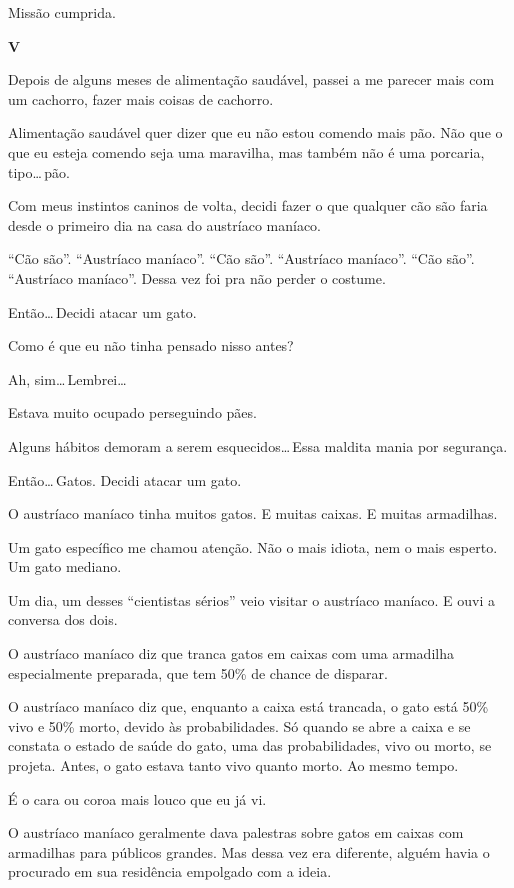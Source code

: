 Missão cumprida.

\begin{center}
{\Large \textbf{V}}
\end{center}

Depois de alguns meses de alimentação saudável, passei a me parecer mais com um cachorro, fazer mais coisas de cachorro.

Alimentação saudável quer dizer que eu não estou comendo mais pão. Não que o que eu esteja comendo seja uma maravilha, mas também não é uma porcaria, tipo\ldots\,pão.

Com meus instintos caninos de volta, decidi fazer o que qualquer cão são faria desde o primeiro dia na casa do austríaco maníaco.

``Cão são''. ``Austríaco maníaco''. ``Cão são''. ``Austríaco maníaco''. ``Cão são''. ``Austríaco maníaco''. Dessa vez foi pra não perder o costume.

Então\ldots\,Decidi atacar um gato.

Como é que eu não tinha pensado nisso antes?

Ah, sim\ldots\,Lembrei\ldots

Estava muito ocupado perseguindo pães.

Alguns hábitos demoram a serem esquecidos\ldots\,Essa maldita mania por segurança.

Então\ldots\,Gatos. Decidi atacar um gato.

O austríaco maníaco tinha muitos gatos. E muitas caixas. E muitas armadilhas.

Um gato específico me chamou atenção. Não o mais idiota, nem o mais esperto. Um gato mediano.

Um dia, um desses ``cientistas sérios'' veio visitar o austríaco maníaco. E ouvi a conversa dos dois.

O austríaco maníaco diz que tranca gatos em caixas com uma armadilha especialmente preparada, que tem 50\% de chance de disparar.

O austríaco maníaco diz que, enquanto a caixa está trancada, o gato está 50\% vivo e 50\% morto, devido às probabilidades. Só quando se abre a caixa e se constata o estado de saúde do gato, uma das probabilidades, vivo ou morto, se projeta. Antes, o gato estava tanto vivo quanto morto. Ao mesmo tempo.

É o cara ou coroa mais louco que eu já vi.

O austríaco maníaco geralmente dava palestras sobre gatos em caixas com armadilhas para públicos grandes. Mas dessa vez era diferente, alguém havia o procurado em sua residência empolgado com a ideia.

